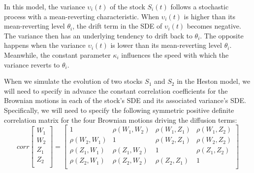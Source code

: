 \documentclass{article}
\begin{document}
	In this model, the variance $\upsilon_i(t)$ of the stock $S_i(t)$ follows a stochastic process with a mean-reverting characteristic. When $\upsilon_i(t)$ is higher than its mean-reverting level $\theta_i$, the drift term in the SDE of $\upsilon_i(t)$ becomes negative. The variance then has an underlying tendency to drift back to $\theta_i$. The opposite happens when the variance $\upsilon_i(t)$ is lower than its mean-reverting level $\theta_i$. Meanwhile, the constant parameter $\kappa_i$ influences the speed with which the variance reverts to $\theta_i$. 
	
	When we simulate the evolution of two stocks $S_1$ and $S_2$ in the Heston model, we will need to specify in advance the constant correlation coefficients for the Brownian motions in each of the stock's SDE and its associated variance's SDE. Specifically, we will need to specify the following symmetric positive definite correlation matrix for the four Brownian motions driving the diffusion terms:
	\begin{equation}
	corr
	\begin{bmatrix} 
	W_1  \\
	W_2  \\
	Z_1  \\
	Z_2  \\
	\end{bmatrix}
	=
	\begin{bmatrix} 
	1 & \rho(W_1,W_2) & \rho(W_1,Z_1) & \rho(W_1,Z_2) \\
	\rho(W_2,W_1) & 1 & \rho(W_2,Z_1) & \rho(W_2,Z_2) \\
	\rho(Z_1,W_1) & \rho(Z_1,W_2) & 1 & \rho(Z_1,Z_2) \\
	\rho(Z_2,W_1) & \rho(Z_2,W_2) & \rho(Z_2,Z_1) & 1 \\
	\end{bmatrix}
	\end{equation}
	
\end{document}
